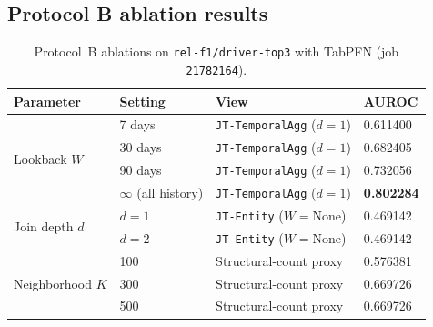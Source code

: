 \documentclass[11pt]{article}
\newcommand{\viewname}[1]{\texttt{#1}}
\begin{document}
\subsection{Protocol B ablation results}
\label{sec:protocol_b_results}

\begin{table}[t]
\centering
\caption{Protocol~B ablations on \texttt{rel-f1/driver-top3} with TabPFN
         (job \texttt{21782164}).}
\label{tab:protocol-b-driver-top3}
\begin{tabular}{llll}
\toprule
Parameter & Setting & View & AUROC \\
\midrule
\multirow{4}{*}{Lookback $W$}
  & 7 days          & \viewname{JT-TemporalAgg} ($d=1$) & 0.611400 \\
  & 30 days         & \viewname{JT-TemporalAgg} ($d=1$) & 0.682405 \\
  & 90 days         & \viewname{JT-TemporalAgg} ($d=1$) & 0.732056 \\
  & $\infty$ (all history) & \viewname{JT-TemporalAgg} ($d=1$) & \textbf{0.802284} \\
\midrule
\multirow{2}{*}{Join depth $d$}
  & $d=1$ & \viewname{JT-Entity} ($W=\mathrm{None}$) & 0.469142 \\
  & $d=2$ & \viewname{JT-Entity} ($W=\mathrm{None}$) & 0.469142 \\
\midrule
\multirow{3}{*}{Neighborhood $K$}
  & 100 & Structural-count proxy & 0.576381 \\
  & 300 & Structural-count proxy & 0.669726 \\
  & 500 & Structural-count proxy & 0.669726 \\
\bottomrule
\end{tabular}
\end{table}
\end{document}
